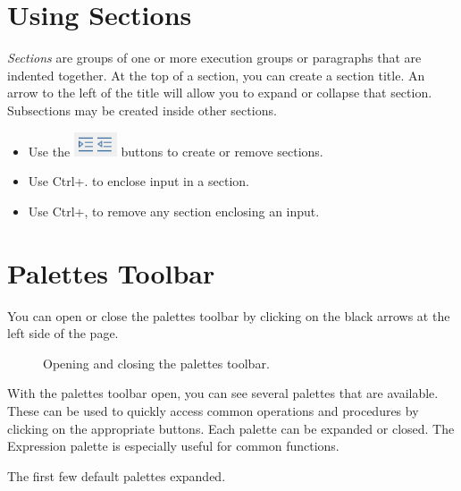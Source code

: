 \section{Using Sections}

\textit{Sections} are groups of one or more execution groups or paragraphs that are indented together. At the top of a section, you can create a section title. An arrow to the left of the title will allow you to expand or collapse that section. Subsections may be created inside other sections.

\begin{itemize}
\item Use the \includegraphics[width=0.1\textwidth]{tutorials/figures/new_section.PNG} buttons to create or remove sections.
\item Use Ctrl+. to enclose input in a section.
\item Use Ctrl+, to remove any section enclosing an input.
\end{itemize}

\section{Palettes Toolbar}

You can open or close the palettes toolbar by clicking on the black arrows at the left side of the page.
\begin{figure}
\hspace{.2cm}
\caption{Opening and closing the palettes toolbar.}
\end{figure}

With the palettes toolbar open, you can see several palettes that are available. These can be used to quickly access common operations and procedures by clicking on the appropriate buttons. Each palette can be expanded or closed. The Expression palette is especially useful for common functions.

\begin{marginfigure}
\centering
{}
\caption{The first few default palettes expanded.}
\end{marginfigure}
